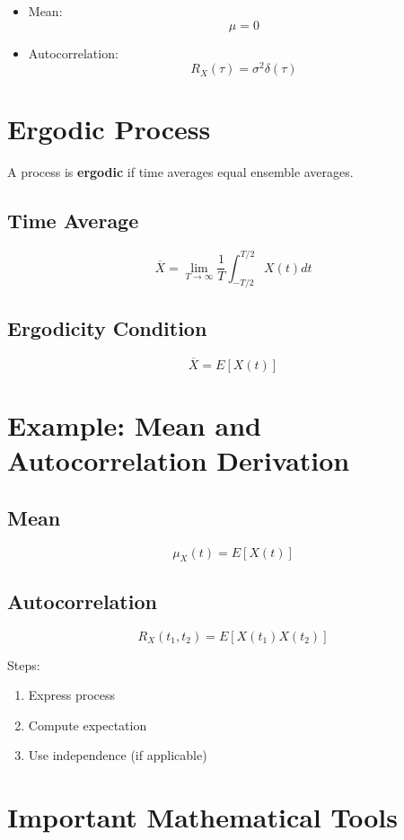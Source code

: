 \documentclass[11pt]{article}
\begin{document}
\begin{itemize}
    \item Mean:
    \[
    \mu = 0
    \]
    
    \item Autocorrelation:
    \[
    R_X(\tau) = \sigma^2 \delta(\tau)
    \]
\end{itemize}

\section{Ergodic Process}

A process is \textbf{ergodic} if time averages equal ensemble averages.

\subsection{Time Average}

\[
\overline{X} = \lim_{T \to \infty} \frac{1}{T} \int_{-T/2}^{T/2} X(t) dt
\]

\subsection{Ergodicity Condition}

\[
\overline{X} = E[X(t)]
\]

\section{Example: Mean and Autocorrelation Derivation}

\subsection{Mean}
\[
\mu_X(t) = E[X(t)]
\]

\subsection{Autocorrelation}
\[
R_X(t_1,t_2) = E[X(t_1)X(t_2)]
\]

Steps:
\begin{enumerate}
    \item Express process
    \item Compute expectation
    \item Use independence (if applicable)
\end{enumerate}

\section{Important Mathematical Tools}
\end{document}
